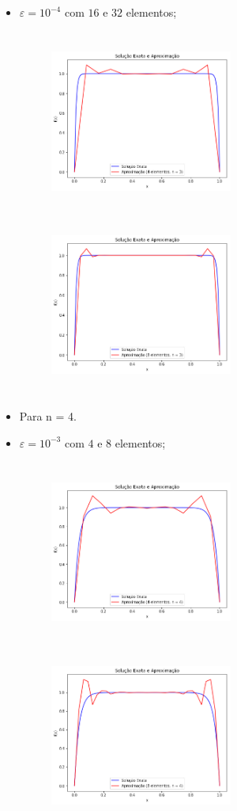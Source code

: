 \documentclass{article}
\begin{document}
\begin{itemize}
\begin{itemize}
\item $\varepsilon = 10^{-4}$ com $16$ e $32$ elementos;

\begin{figure}[!htb]
\centering
\includegraphics [width=6cm,height=6cm]{LetraC/4el_n3_e10-4.png}
\includegraphics [width=6cm,height=6cm]{LetraC/8el_n3_e10-4.png}
\end{figure}

\newpage
\item Para n = 4.
\item $\varepsilon = 10^{-3}$ com $4$ e $8$ elementos;

\begin{figure}[!htb]
\centering
\includegraphics [width=6cm,height=6cm]{LetraC/4el_n4_e10-3.png}
\includegraphics [width=6cm,height=6cm]{LetraC/8el_n4_e10-3.png}
\end{figure}


\end{itemize}
\end{itemize}
\end{document}
